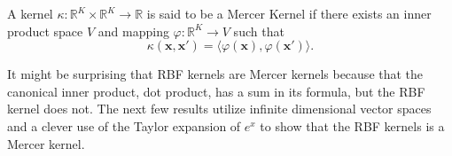 \begin{definition}
    A kernel $\kappa: \mathbb{R}^{K} \times \mathbb{R}^{K} \to \mathbb{R}$
    is said to be a Mercer Kernel if there exists an inner product space
    $V$ and mapping $\varphi: \mathbb{R}^{K} \to V$ such that
    \begin{equation*}
        \kappa(\mathbf{x}, \mathbf{x}') = \langle \varphi(\mathbf{x}), \varphi(\mathbf{x}') \rangle.
    \end{equation*}
\end{definition}

It might be surprising that RBF kernels are Mercer kernels because that the canonical inner product, dot product, has a sum in its formula, but the RBF kernel does not.
The next few results utilize infinite dimensional vector spaces and a clever use of the Taylor expansion of $e^{x}$ to show that the RBF kernels is a Mercer kernel.

